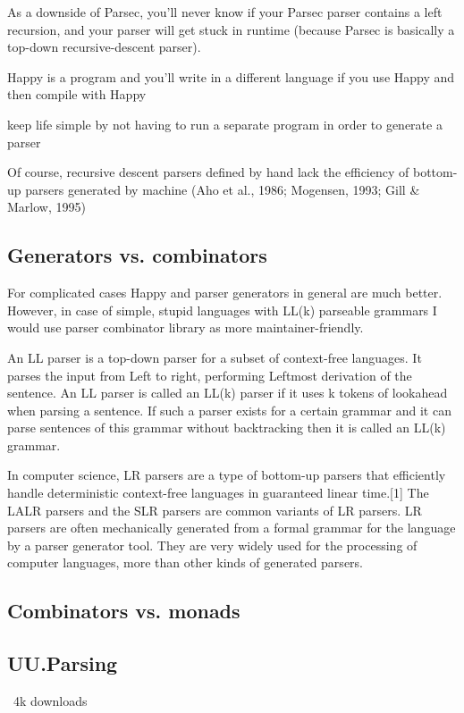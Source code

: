 As a downside of Parsec, you'll never know if your Parsec parser contains a left recursion, and your parser will get stuck in runtime (because Parsec is basically a top-down recursive-descent parser).

Happy is a program and you'll write in a different language if you use Happy and then compile with Happy

 keep life simple by not having to run a separate program in order to generate a parser 

Of course, recursive descent parsers defined by hand lack the efficiency of bottom-up parsers generated by machine (Aho et al., 1986; Mogensen, 1993; Gill & Marlow, 1995)

\subsection{Generators vs. combinators}
For complicated cases Happy and parser generators in general are much better. However, in case of simple, stupid languages with LL(k) parseable grammars I would use parser combinator library as more maintainer-friendly.

An LL parser is a top-down parser for a subset of context-free languages. It parses the input from Left to right, performing Leftmost derivation of the sentence.
An LL parser is called an LL(k) parser if it uses k tokens of lookahead when parsing a sentence. If such a parser exists for a certain grammar and it can parse sentences of this grammar without backtracking then it is called an LL(k) grammar.

In computer science, LR parsers are a type of bottom-up parsers that efficiently handle deterministic context-free languages in guaranteed linear time.[1] The LALR parsers and the SLR parsers are common variants of LR parsers. LR parsers are often mechanically generated from a formal grammar for the language by a parser generator tool. They are very widely used for the processing of computer languages, more than other kinds of generated parsers.

\subsection{Combinators vs. monads}
\lipsum[1]

\subsection{UU.Parsing}
%
~4k downloads

